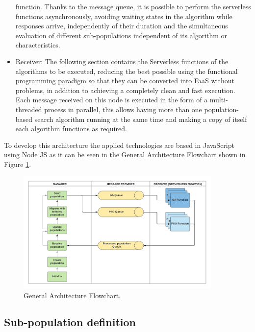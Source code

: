 \documentclass[runningheads]{llncs}
\begin{document}
\begin{itemize}
function. Thanks to the message queue, it is possible to perform the serverless
functions asynchronously, avoiding waiting states in the algorithm
while responses arrive, 
independently of their duration and the simultaneous evaluation of different
sub-populations independent of its algorithm or characteristics.
\item Receiver: The following section contains the Serverless
  functions of the %
algorithms to be executed, reducing the best possible using the functional
programming paradigm so that they can be converted into FaaS without problems,
in addition to achieving a completely clean and fast
execution\cite{Roberts2016}. Each message received on this node is executed in
the form of a multi-threaded process in parallel, this allows having more than
one population-based search algorithm running at the same time and making a copy
of itself each algorithm functions as required.
\end{itemize}

To develop this architecture the applied technologies are based in JavaScript
using Node JS as it can be seen in the General Architecture Flowchart
shown in Figure \ref{fig2}.

\begin{figure}[htp]
  \centering
  \includegraphics[width=0.9\textwidth]{img/Architecture diagram.png}
  \caption{General Architecture Flowchart.} \label{fig2}
  \end{figure}
  
\subsection{Sub-population definition}
\end{document}
